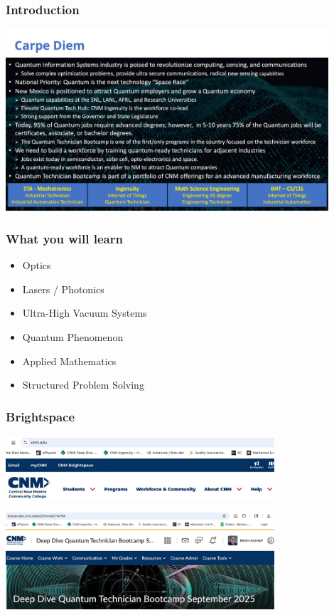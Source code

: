 \documentclass{beamer}
\begin{document}
\begin{frame}\frametitle{Introduction}
\begin{center}
\includegraphics[width=12cm]{fig/Slide15.jpeg}
\end{center}
\end{frame}



\begin{frame}\frametitle{What you will learn}
\begin{itemize}
\item Optics
\item Lasers / Photonics
\item Ultra-High Vacuum Systems
\item Quantum Phenomenon
\item Applied Mathematics
\item Structured Problem Solving
\end{itemize}
\end{frame}


\begin{frame}\frametitle{Brightspace}
\begin{center}
\includegraphics[width=10cm]{fig/brightspace1.jpg}

\vspace{1cm}

\includegraphics[width=10cm]{fig/brightspace2.jpg}
\end{center}
\end{frame}
\end{document}
